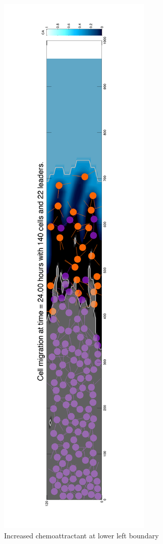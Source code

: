 \documentclass[portrait,a0paper,fontscale=0.292]{baposter}
\begin{document}
\begin{poster}
{\begin{minipage}{250pt}
	\includegraphics[trim=68 30 25 200, clip,scale=0.35,angle=270]{modelControl-crop}\\%
	\hspace*{3pt} Increased chemoattractant at lower left boundary\\[-5pt]

\end{minipage}}
\end{poster}
\end{document}
